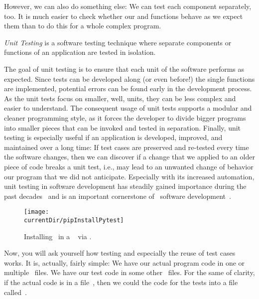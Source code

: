 However, we can also do something else:
We can test each component separately, too.
It is much easier to check whether our  and  functions behave as we expect them than to do this for a whole complex program.%
%
\begin{definition}
\emph{Unit Testing} is a software testing technique where separate components or functions of an application are tested in isolation.
\end{definition}%
%
The goal of unit testing is to ensure that each unit of the software performs as expected.
Since tests can be developed along (or even before!) the single functions are implemented, potential errors can be found early in the development process.
As the unit tests focus on smaller, well, units, they can be less complex and easier to understand.
The consequent usage of unit tests supports a modular and cleaner programming style, as it forces the developer to divide bigger programs into smaller pieces that can be invoked and tested in separation.
Finally, unit testing is especially useful if an application is developed, improved, and maintained over a long time:
If test cases are preserved and re-tested every time the software changes, then we can discover if a change that we applied to an older piece of code breaks a unit test, i.e., may lead to an unwanted change of behavior our program that we did not anticipate.
Especially with its increased automation, unit testing in software development has steadily gained importance during the past decades~\cite{W2000WISTAWIISH,TLG2006UTCU,R2006ASOUTP} and is an important cornerstone of \python\ software development~\cite{P2021PUTAAOAEUTIP,O2022PTWP,DG2020TIP}.%
%
%
\begin{figure}%
\centering%
\texttt{[image: \\currentDir/pipInstallPytest]}%
\caption{Installing \pytest\ in a \ubuntu\  via \pip.}%
\label{fig:pipInstallPytest}%
\end{figure}%
%
%
%
Now, you will ask yourself how testing and especially the reuse of test cases works.
It is, actually, fairly simple:
We have our actual program code in one or multiple \python\ files.
We have our test code in some other \python\ files.
For the same of clarity, if the actual code is in a file~, then we could the code for the tests into a file called~.

